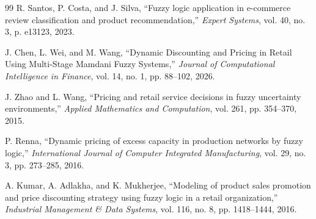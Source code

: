 \documentclass[conference]{IEEEtran}
\begin{document}
\begin{thebibliography}{99}
R. Santos, P. Costa, and J. Silva, ``Fuzzy logic application in e-commerce review classification and product recommendation,'' \textit{Expert Systems}, vol. 40, no. 3, p. e13123, 2023.

J. Chen, L. Wei, and M. Wang, ``Dynamic Discounting and Pricing in Retail Using Multi-Stage Mamdani Fuzzy Systems,'' \textit{Journal of Computational Intelligence in Finance}, vol. 14, no. 1, pp. 88--102, 2026.

J. Zhao and L. Wang, ``Pricing and retail service decisions in fuzzy uncertainty environments,'' \textit{Applied Mathematics and Computation}, vol. 261, pp. 354--370, 2015.

P. Renna, ``Dynamic pricing of excess capacity in production networks by fuzzy logic,'' \textit{International Journal of Computer Integrated Manufacturing}, vol. 29, no. 3, pp. 273--285, 2016.

A. Kumar, A. Adlakha, and K. Mukherjee, ``Modeling of product sales promotion and price discounting strategy using fuzzy logic in a retail organization,'' \textit{Industrial Management \& Data Systems}, vol. 116, no. 8, pp. 1418--1444, 2016.

\end{thebibliography}
\end{document}
